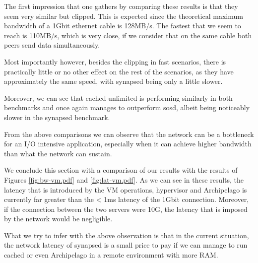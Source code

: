 The first impression that one gathers by comparing these results is that they 
seem very similar but clipped. This is expected since the theoretical maximum 
bandwidth of a 1Gbit ethernet cable is 128MB/s. The fastest that we seem to 
reach is 110MB/s, which is very close, if we consider that on the same cable 
both peers send data simultaneously. 

Most importantly however, besides the clipping in fast scenarios, there is 
practically little or no other effect on the rest of the scenarios, as they 
have approximately the same speed, with synapsed being only a little slower.

Moreover, we can see that cached-unlimited is performing similarly in both 
benchmarks and once again manages to outperform sosd, albeit being noticeably 
slower in the synapsed benchmark.

From the above comparisons we can observe that the network can be a bottleneck 
for an I/O intensive application, especially when it can achieve higher 
bandwidth than what the network can sustain.

We conclude this section with a comparison of our results with the results of 
Figures \ref{fig:bw-vm.pdf} and \ref{fig:lat-vm.pdf}. As we can see in these 
results, the latency that is introduced by the VM operations, hypervisor and 
Archipelago is currently far greater than the < 1ms latency of the 1Gbit 
connection. Moreover, if the connection between the two servers were 10G, the 
latency that is imposed by the network would be negligible.

What we try to infer with the above observation is that in the current 
situation, the network latency of synapsed is a small price to pay if we can 
manage to run cached or even Archipelago in a remote environment with more RAM.
